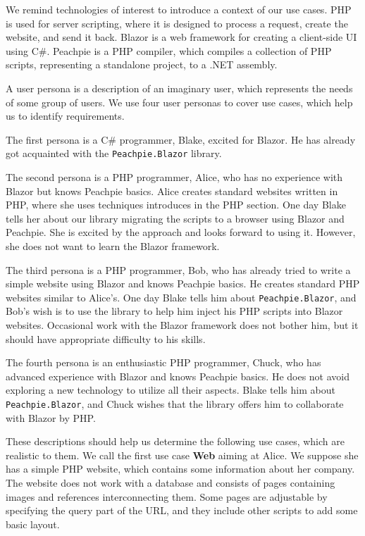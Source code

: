 We remind technologies of interest to introduce a context of our use cases.
PHP is used for server scripting, where it is designed to process a request, create the website, and send it back.
Blazor is a web framework for creating a client-side UI using C\#.
Peachpie is a PHP compiler, which compiles a collection of PHP scripts, representing a standalone project, to a .NET assembly.
\par
A user persona \cite{online:persona} is a description of an imaginary user, which represents the needs of some group of users.
We use four user personas to cover use cases, which help us to identify requirements.
\par
The first persona is a C\# programmer, Blake, excited for Blazor.
He has already got acquainted with the \texttt{Peachpie.Blazor} library.
\par
The second persona is a PHP programmer, Alice, who has no experience with Blazor but knows Peachpie basics.
Alice creates standard websites written in PHP, where she uses techniques introduces in the PHP section.
One day Blake tells her about our library migrating the scripts to a browser using Blazor and Peachpie.
She is excited by the approach and looks forward to using it.
However, she does not want to learn the Blazor framework.
\par
The third persona is a PHP programmer, Bob, who has already tried to write a simple website using Blazor and knows Peachpie basics.
He creates standard PHP websites similar to Alice's.
One day Blake tells him about \texttt{Peachpie.Blazor}, and Bob's wish is to use the library to help him inject his PHP scripts into Blazor websites.
Occasional work with the Blazor framework does not bother him, but it should have appropriate difficulty to his skills.
\par
The fourth persona is an enthusiastic PHP programmer, Chuck, who has advanced experience with Blazor and knows Peachpie basics.
He does not avoid exploring a new technology to utilize all their aspects.
Blake tells him about \texttt{Peachpie.Blazor}, and Chuck wishes that the library offers him to collaborate with Blazor by PHP.
\par
These descriptions should help us determine the following use cases, which are realistic to them.
We call the first use case \textbf{Web} aiming at Alice.
We suppose she has a simple PHP website, which contains some information about her company.
The website does not work with a database and consists of pages containing images and references interconnecting them.
Some pages are adjustable by specifying the query part of the URL, and they include other scripts to add some basic layout.
